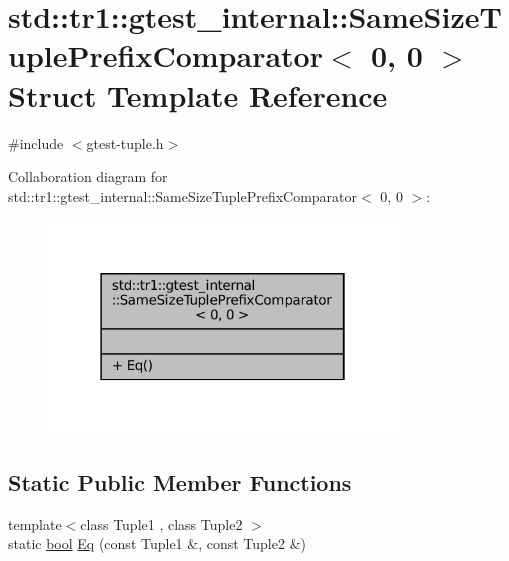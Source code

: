 \hypertarget{structstd_1_1tr1_1_1gtest__internal_1_1SameSizeTuplePrefixComparator_3_010_00_010_01_4}{}\section{std\+:\+:tr1\+:\+:gtest\+\_\+internal\+:\+:Same\+Size\+Tuple\+Prefix\+Comparator$<$ 0, 0 $>$ Struct Template Reference}
\label{structstd_1_1tr1_1_1gtest__internal_1_1SameSizeTuplePrefixComparator_3_010_00_010_01_4}


{\ttfamily \#include $<$gtest-\/tuple.\+h$>$}



Collaboration diagram for std\+:\+:tr1\+:\+:gtest\+\_\+internal\+:\+:Same\+Size\+Tuple\+Prefix\+Comparator$<$ 0, 0 $>$\+:
\nopagebreak
\begin{figure}[H]
\begin{center}
\leavevmode
\includegraphics[width=262pt]{structstd_1_1tr1_1_1gtest__internal_1_1SameSizeTuplePrefixComparator_3_010_00_010_01_4__coll__graph}
\end{center}
\end{figure}
\subsection*{Static Public Member Functions}
\begin{DoxyCompactItemize}
\item 
{\footnotesize template$<$class Tuple1 , class Tuple2 $>$ }\\static \hyperlink{classbool}{bool} \hyperlink{structstd_1_1tr1_1_1gtest__internal_1_1SameSizeTuplePrefixComparator_3_010_00_010_01_4_a4f209822266c6bb1832c49750a11ef95}{Eq} (const Tuple1 \&, const Tuple2 \&)
\end{DoxyCompactItemize}


